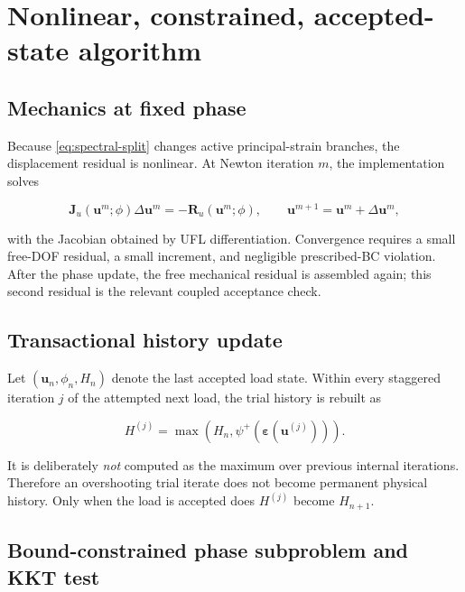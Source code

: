\documentclass[11pt,a4paper]{article}
\begin{document}
\section{Nonlinear, constrained, accepted-state algorithm}
\label{sec:accepted-state}

\subsection{Mechanics at fixed phase}

Because \cref{eq:spectral-split} changes active principal-strain branches, the
displacement residual is nonlinear. At Newton iteration $m$, the implementation
solves

\begin{equation}
  \boldsymbol{J}_u(\boldsymbol{u}^{m};\phi)
  \Delta\boldsymbol{u}^{m}
  =-\boldsymbol{R}_u(\boldsymbol{u}^{m};\phi),
  \qquad
  \boldsymbol{u}^{m+1}=\boldsymbol{u}^{m}+\Delta\boldsymbol{u}^{m},
\end{equation}

with the Jacobian obtained by UFL differentiation. Convergence requires a small
free-DOF residual, a small increment, and negligible prescribed-BC violation.
After the phase update, the free mechanical residual is assembled again; this
second residual is the relevant coupled acceptance check.

\subsection{Transactional history update}

Let $(\boldsymbol{u}_n,\phi_n,H_n)$ denote the last accepted load state. Within
every staggered iteration $j$ of the attempted next load, the trial history is
rebuilt as

\begin{equation}
  H^{(j)}=\max\left(H_n,
  \psi^+(\boldsymbol{\varepsilon}(\boldsymbol{u}^{(j)}))\right).
  \label{eq:transactional-history}
\end{equation}

It is deliberately \emph{not} computed as the maximum over previous internal
iterations. Therefore an overshooting trial iterate does not become permanent
physical history. Only when the load is accepted does $H^{(j)}$ become
$H_{n+1}$.

\subsection{Bound-constrained phase subproblem and KKT test}
\end{document}
